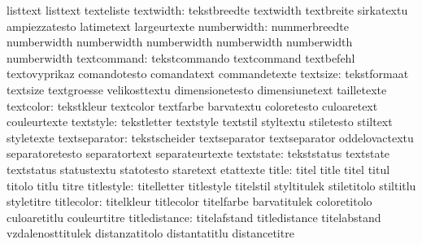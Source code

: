                            listtext                  listtext
                           texteliste
                textwidth: tekstbreedte              textwidth
                           textbreite                sirkatextu
                           ampiezzatesto             latimetext
                           largeurtexte
numberwidth: nummerbreedte numberwidth
             numberwidth   numberwidth
             numberwidth   numberwidth
             numberwidth
              textcommand: tekstcommando             textcommand
                           textbefehl                textovyprikaz
                           comandotesto              comandatext
                           commandetexte
                 textsize: tekstformaat              textsize
                           textgroesse               velikosttextu
                           dimensionetesto           dimensiunetext
                           tailletexte
                textcolor: tekstkleur                textcolor
                           textfarbe                 barvatextu
                           coloretesto               culoaretext
                           couleurtexte
                textstyle: tekstletter               textstyle
                           textstil                  styltextu
                           stiletesto                stiltext
                           styletexte
            textseparator: tekstscheider             textseparator
                           textseparator             oddelovactextu
                           separatoretesto           separatortext
                           separateurtexte
                textstate: tekststatus               textstate
                           textstatus                statustextu
                           statotesto                staretext
                           etattexte
                    title: titel                     title
                           titel                     titul
                           titolo                    titlu
                           titre
               titlestyle: titelletter               titlestyle
                           titelstil                 styltitulek
                           stiletitolo               stiltitlu
                           styletitre
               titlecolor: titelkleur                titlecolor
                           titelfarbe                barvatitulek
                           coloretitolo              culoaretitlu
                           couleurtitre
            titledistance: titelafstand              titledistance
                           titelabstand              vzdalenosttitulek
                           distanzatitolo            distantatitlu
                           distancetitre


